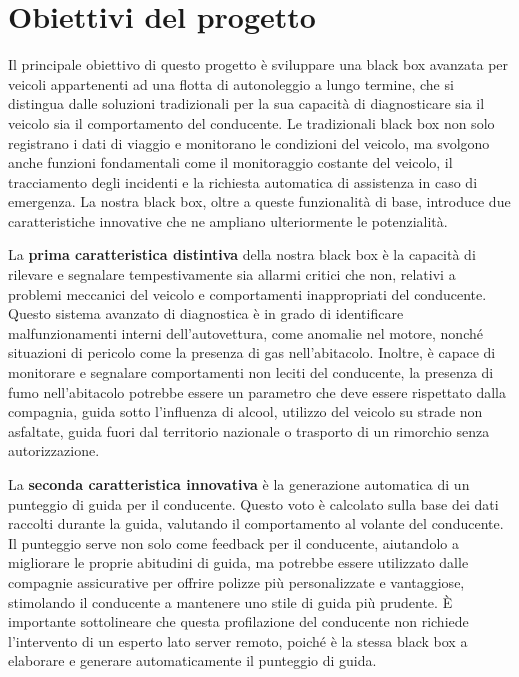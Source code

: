 \documentclass[12pt, a4paper, italian]{report}
\numberwithin{figure}{chapter}
\numberwithin{table}{chapter}
\begin{document}
\section{Obiettivi del progetto}
Il principale obiettivo di questo progetto è sviluppare una black box avanzata per veicoli appartenenti ad una flotta di autonoleggio a lungo termine, che si distingua dalle soluzioni tradizionali per la sua capacità di diagnosticare sia il veicolo sia il comportamento del conducente. Le tradizionali black box non solo registrano i dati di viaggio e monitorano le condizioni del veicolo, ma svolgono anche funzioni fondamentali come il monitoraggio costante del veicolo, il tracciamento degli incidenti e la richiesta automatica di assistenza in caso di emergenza. La nostra black box, oltre a queste funzionalità di base, introduce due caratteristiche innovative che ne ampliano ulteriormente le potenzialità.

\vspace{1cm}

La \textbf{prima caratteristica distintiva} della nostra black box è la capacità di rilevare e segnalare tempestivamente sia allarmi critici che non, relativi a problemi meccanici del veicolo e comportamenti inappropriati del conducente. Questo sistema avanzato di diagnostica è in grado di identificare malfunzionamenti interni dell’autovettura, come anomalie nel motore, nonché situazioni di pericolo come la presenza di gas nell'abitacolo. Inoltre, è capace di monitorare e segnalare comportamenti non leciti del conducente, la presenza di fumo nell'abitacolo potrebbe essere un parametro che deve essere rispettato dalla compagnia, guida sotto l'influenza di alcool, utilizzo del veicolo su strade non asfaltate, guida fuori dal territorio nazionale o trasporto di un rimorchio senza autorizzazione.

\vspace{1cm}

La \textbf{seconda caratteristica innovativa} è la generazione automatica di un punteggio di guida per il conducente. Questo voto è calcolato sulla base dei dati raccolti durante la guida, valutando il comportamento al volante del conducente. Il punteggio serve non solo come feedback per il conducente, aiutandolo a migliorare le proprie abitudini di guida, ma potrebbe essere utilizzato dalle compagnie assicurative per offrire polizze più personalizzate e vantaggiose, stimolando il conducente a mantenere uno stile di guida più prudente. È importante sottolineare che questa profilazione del conducente non richiede l'intervento di un esperto lato server remoto, poiché è la stessa black box a elaborare e generare automaticamente il punteggio di guida.
\end{document}
